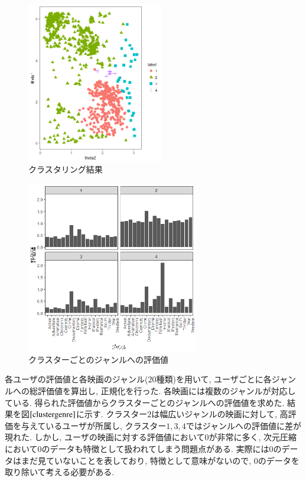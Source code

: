 \documentclass[a4j,11pt]{jarticle}
\begin{document}
\begin{figure}
\vspace{-0.5cm}
\begin{center}
\includegraphics[clip,height= 70mm]{data/cluster_4.png}
\end{center}
 \vspace{-0.9cm}
\caption{クラスタリング結果}
\label{skmeans}
\end{figure}
\fi

\begin{figure}
\vspace{-0.5cm}
\begin{center}
\includegraphics[clip,height= 75mm]{data/cluster_plot.png}
\end{center}
 \vspace{-0.9cm}
\caption{クラスターごとのジャンルへの評価値}
\label{clustergenre}
\end{figure}

各ユーザの評価値と各映画のジャンル($20$種類)を用いて, ユーザごとに各ジャンルへの総評価値を算出し, 正規化を行った. 各映画には複数のジャンルが対応している. 得られた評価値からクラスターごとのジャンルへの評価値を求めた. 結果を図$\ref{clustergenre}$に示す. クラスター$2$は幅広いジャンルの映画に対して, 高評価を与えているユーザが所属し, クラスター$1,3,4$ではジャンルへの評価値に差が現れた. しかし, ユーザの映画に対する評価値において$0$が非常に多く, 次元圧縮において$0$のデータも特徴として扱われてしまう問題点がある. 実際には$0$のデータはまだ見ていないことを表しており, 特徴として意味がないので, $0$のデータを取り除いて考える必要がある.
\end{document}
